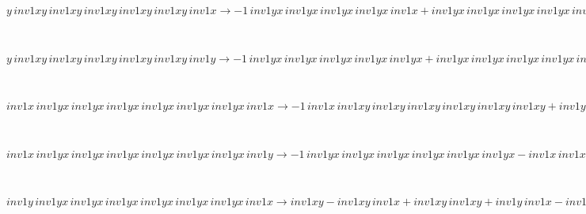 \documentclass[rep10,leqno]{report}
\begin{document}
\begin{minipage}{6in}
$
y\,
 inv1xy\,
 inv1xy\,
 inv1xy\,
 inv1xy\,
 inv1xy\,
 inv1x\rightarrow -1\,
 inv1yx\,
 inv1yx\,
 inv1yx\,
 inv1yx\,
 inv1x + inv1yx\,
 inv1yx\,
 inv1yx\,
 inv1yx\,
 inv1yx\,
 inv1x + y\,
 inv1xy\,
 inv1xy\,
 inv1xy\,
 inv1xy\,
 inv1xy
$
\end{minipage}\medskip \\
\begin{minipage}{6in}
$
y\,
 inv1xy\,
 inv1xy\,
 inv1xy\,
 inv1xy\,
 inv1xy\,
 inv1y\rightarrow -1\,
 inv1yx\,
 inv1yx\,
 inv1yx\,
 inv1yx\,
 inv1yx + inv1yx\,
 inv1yx\,
 inv1yx\,
 inv1yx\,
 inv1yx\,
 inv1y
$
\end{minipage}\medskip \\
\begin{minipage}{6in}
$
inv1x\,
 inv1yx\,
 inv1yx\,
 inv1yx\,
 inv1yx\,
 inv1yx\,
 inv1yx\,
 inv1x\rightarrow -1\,
 inv1x\,
 inv1xy\,
 inv1xy\,
 inv1xy\,
 inv1xy\,
 inv1xy\,
 inv1xy + inv1yx\,
 inv1yx\,
 inv1yx\,
 inv1yx\,
 inv1yx\,
 inv1yx\,
 inv1x + inv1x\,
 inv1xy\,
 inv1xy\,
 inv1xy\,
 inv1xy\,
 inv1xy\,
 inv1xy\,
 inv1x
$
\end{minipage}\medskip \\
\begin{minipage}{6in}
$
inv1x\,
 inv1yx\,
 inv1yx\,
 inv1yx\,
 inv1yx\,
 inv1yx\,
 inv1yx\,
 inv1y\rightarrow -1\,
 inv1yx\,
 inv1yx\,
 inv1yx\,
 inv1yx\,
 inv1yx\,
 inv1yx - inv1x\,
 inv1xy\,
 inv1xy\,
 inv1xy\,
 inv1xy\,
 inv1xy\,
 inv1y + inv1x\,
 inv1yx\,
 inv1yx\,
 inv1yx\,
 inv1yx\,
 inv1yx\,
 inv1yx + inv1yx\,
 inv1yx\,
 inv1yx\,
 inv1yx\,
 inv1yx\,
 inv1yx\,
 inv1y + inv1x\,
 inv1xy\,
 inv1xy\,
 inv1xy\,
 inv1xy\,
 inv1xy\,
 inv1xy\,
 inv1y
$
\end{minipage}\medskip \\
\begin{minipage}{6in}
$
inv1y\,
 inv1yx\,
 inv1yx\,
 inv1yx\,
 inv1yx\,
 inv1yx\,
 inv1yx\,
 inv1x\rightarrow inv1xy - inv1xy\,
 inv1x + inv1xy\,
 inv1xy + inv1y\,
 inv1x - inv1y\,
 inv1xy - inv1xy\,
 inv1xy\,
 inv1x + inv1xy\,
 inv1xy\,
 inv1xy + inv1y\,
 inv1xy\,
 inv1x - inv1y\,
 inv1xy\,
 inv1xy - inv1xy\,
 inv1xy\,
 inv1xy\,
 inv1x + inv1xy\,
 inv1xy\,
 inv1xy\,
 inv1xy + inv1y\,
 inv1xy\,
 inv1xy\,
 inv1x - inv1y\,
 inv1xy\,
 inv1xy\,
 inv1xy - inv1xy\,
 inv1xy\,
 inv1xy\,
 inv1xy\,
 inv1x + inv1xy\,
 inv1xy\,
 inv1xy\,
 inv1xy\,
 inv1xy + inv1y\,
 inv1xy\,
 inv1xy\,
 inv1xy\,
 inv1x - inv1y\,
 inv1xy\,
 inv1xy\,
 inv1xy\,
 inv1xy - inv1xy\,
 inv1xy\,
 inv1xy\,
 inv1xy\,
 inv1xy\,
 inv1x + inv1xy\,
 inv1xy\,
 inv1xy\,
 inv1xy\,
 inv1xy\,
 inv1xy + inv1y\,
 inv1xy\,
 inv1xy\,
 inv1xy\,
 inv1xy\,
 inv1x - inv1y\,
 inv1xy\,
 inv1xy\,
 inv1xy\,
 inv1xy\,
 inv1xy - inv1xy\,
 inv1xy\,
 inv1xy\,
 inv1xy\,
 inv1xy\,
 inv1xy\,
 inv1x + inv1y\,
 inv1xy\,
 inv1xy\,
 inv1xy\,
 inv1xy\,
 inv1xy\,
 inv1x - inv1y\,
 inv1xy\,
 inv1xy\,
 inv1xy\,
 inv1xy\,
 inv1xy\,
 inv1xy + inv1y\,
 inv1xy\,
 inv1xy\,
 inv1xy\,
 inv1xy\,
 inv1xy\,
 inv1xy\,
 inv1x
$
\end{minipage}\medskip \\
\end{document}

